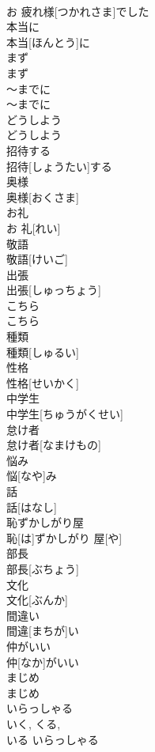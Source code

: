 \documentclass[8pt]{extreport}
\begin{document}
\begin{CJK}{UTF8}{min}
\\	お 疲れ様[つかれさま]でした
\\	本当に	
\\	本当[ほんとう]に
\\	まず	
\\	まず
\\	〜までに	
\\	〜までに
\\	どうしよう	
\\	どうしよう
\\	招待する	
\\	招待[しょうたい]する
\\	奥様	
\\	奥様[おくさま]
\\	お礼	
\\	お 礼[れい]
\\	敬語	
\\	敬語[けいご]
\\	出張	
\\	出張[しゅっちょう]
\\	こちら	
\\	こちら
\\	種類	
\\	種類[しゅるい]
\\	性格	
\\	性格[せいかく]
\\	中学生	
\\	中学生[ちゅうがくせい]
\\	怠け者	
\\	怠け者[なまけもの]
\\	悩み	
\\	悩[なや]み
\\	話	
\\	話[はなし]
\\	恥ずかしがり屋	
\\	恥[は]ずかしがり 屋[や]
\\	部長	
\\	部長[ぶちょう]
\\	文化	
\\	文化[ぶんか]
\\	間違い	
\\	間違[まちが]い
\\	仲がいい	
\\	仲[なか]がいい
\\	まじめ	
\\	まじめ
\\	いらっしゃる	
\\	いく, くる, 
\\	いる	いらっしゃる

\end{CJK}
\end{document}
